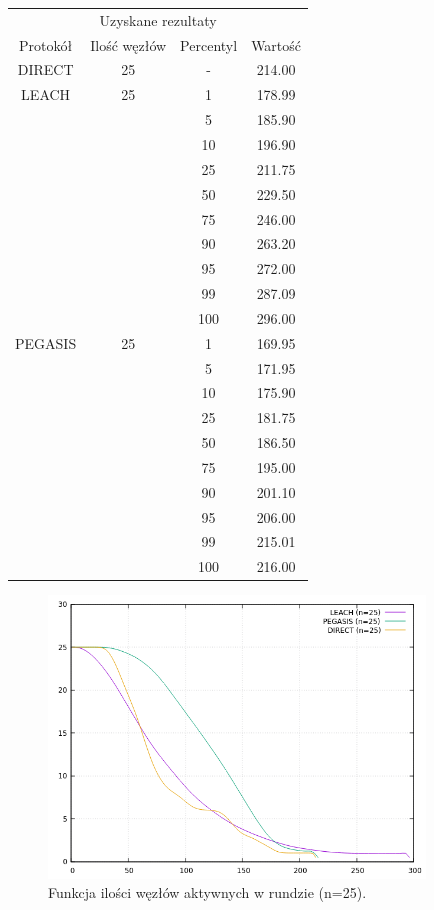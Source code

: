 \documentclass[a4paper,12pt,twoside,openany]{report}
\begin{document}
\begin{longtable}{*{4}{c}}
\toprule
\multicolumn{4}{c}{Uzyskane rezultaty} \\
Protokół	& Ilość węzłów	& Percentyl	& Wartość \\
\midrule
\endhead
DIRECT	& 25 	& -	& 214.00 \\*
\midrule
LEACH	& 25	& 1	& 178.99 \\*
	&	& 5	& 185.90 \\*
	&	& 10	& 196.90 \\*
	&	& 25	& 211.75 \\*
	&	& 50	& 229.50 \\*
	&	& 75	& 246.00 \\*
	&	& 90	& 263.20 \\*
	&	& 95	& 272.00 \\*
	&	& 99	& 287.09 \\*
	&	& 100	& 296.00 \\*
\midrule
PEGASIS	& 25	& 1	& 169.95 \\*
	&	& 5	& 171.95 \\*
	&	& 10	& 175.90 \\*
	&	& 25	& 181.75 \\*
	&	& 50	& 186.50 \\*
	&	& 75	& 195.00 \\*
	&	& 90	& 201.10 \\*
	&	& 95	& 206.00 \\*
	&	& 99	& 215.01 \\*
	&	& 100	& 216.00 \\*
\bottomrule
\end{longtable}

\begin{figure}[H]
 \centering
 \includegraphics[width=10cm]{images/gnuplot/test_2/nodes_in_round_25.png}
 \caption{Funkcja ilości węzłów aktywnych w rundzie (n=25).}
\end{figure}
\end{document}
